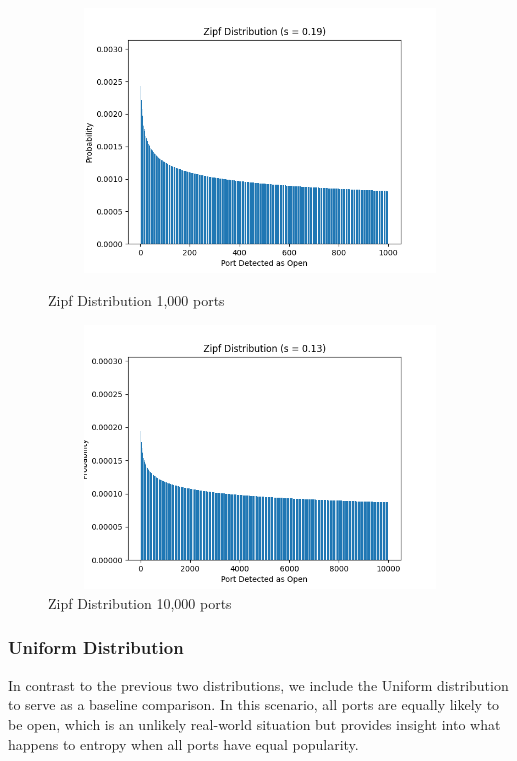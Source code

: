 \begin{figure}[h]
\begin{adjustwidth}{-3cm}{-1cm}
\centering
\begin{minipage}{.45\textwidth}
  \centering
\includegraphics[width=12cm, height=7cm, keepaspectratio]{entropy/img/zipf_distribution_1000.png}
    \caption{Zipf Distribution 1,000 ports}
    \label{fig:zipf_distribution_1000}
\end{minipage}
\hspace{0.5cm}
\begin{minipage}{.45\textwidth}
\includegraphics[width=12cm, height=7cm, keepaspectratio]{entropy/img/zipf_distribution_10000.png}
    \caption{Zipf Distribution 10,000 ports}
    \label{fig:zipf_distribution_10000}
\end{minipage}
\end{adjustwidth}
\end{figure}

\subsubsection{Uniform Distribution}

In contrast to the previous two distributions, we include the Uniform distribution to serve as a baseline comparison. In this scenario, all ports are equally likely to be open, which is an unlikely real-world situation but provides insight into what happens to entropy when all ports have equal popularity.

